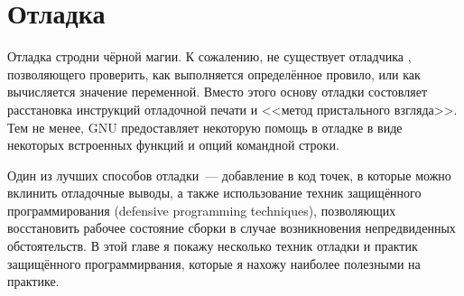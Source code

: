 \chapter{Отладка }
\label{chap:debugging_makefiles}

Отладка  стродни чёрной магии. К сожалению, не существует
отладчика , позволяющего проверить, как выполняется
определённое провило, или как вычисляется значение переменной. Вместо
этого основу отладки состовляет расстановка инструкций отладочной
печати и <<метод пристального взгляда>>. Тем не менее, GNU \GNUmake{}
предоставляет некоторую помощь в отладке в виде некоторых встроенных
функций и опций командной строки.

Один из лучших способов отладки~--- добавление в код точек, в которые
можно вклинить отладочные выводы, а также использование техник
защищённого программирования (defensive programming techniques),
позволяющих восстановить рабочее состояние сборки в случае
возникновения непредвиденных обстоятельств. В этой главе я покажу
несколько техник отладки и практик защищённого программирвания,
которые я нахожу наиболее полезными на практике.




